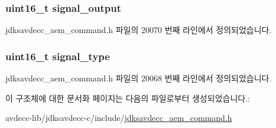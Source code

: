 \subsubsection[{\texorpdfstring{signal\+\_\+output}{signal_output}}]{\setlength{\rightskip}{0pt plus 5cm}uint16\+\_\+t signal\+\_\+output}\hypertarget{structjdksavdecc__aem__command__get__signal__selector__response_ab4b91864e6fc335d7e86536d9f4461e4}{}\label{structjdksavdecc__aem__command__get__signal__selector__response_ab4b91864e6fc335d7e86536d9f4461e4}


jdksavdecc\+\_\+aem\+\_\+command.\+h 파일의 20070 번째 라인에서 정의되었습니다.

\subsubsection[{\texorpdfstring{signal\+\_\+type}{signal_type}}]{\setlength{\rightskip}{0pt plus 5cm}uint16\+\_\+t signal\+\_\+type}\hypertarget{structjdksavdecc__aem__command__get__signal__selector__response_a248e60ef99d5ed1779989d1dd6b6dc5a}{}\label{structjdksavdecc__aem__command__get__signal__selector__response_a248e60ef99d5ed1779989d1dd6b6dc5a}


jdksavdecc\+\_\+aem\+\_\+command.\+h 파일의 20068 번째 라인에서 정의되었습니다.



이 구조체에 대한 문서화 페이지는 다음의 파일로부터 생성되었습니다.\+:\begin{DoxyCompactItemize}
\item 
avdecc-\/lib/jdksavdecc-\/c/include/\hyperlink{jdksavdecc__aem__command_8h}{jdksavdecc\+\_\+aem\+\_\+command.\+h}\end{DoxyCompactItemize}
